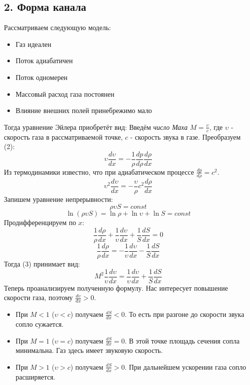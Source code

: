 	\subsection*{2. Форма канала}
	Рассматриваем следующую модель:
	\begin{itemize}
	\item Газ идеален
	\item Поток адиабатичен
	\item Поток одномерен
	\item Массовый расход газа постоянен
	\item Влияние внешних полей принебрежимо мало
	\end{itemize}
	Тогда уравнение Эйлера приобретёт вид:
	Введём \textit{число Маха} $M = \frac{\upsilon}{c}$, где $\upsilon$ - скорость газа в рассматриваемой точке, $c$ - скорость звука в газе.\n\n
	Преобразуем (2):
	\[\upsilon \frac{d\upsilon}{dx} = - \frac{1}{\rho} \frac{dp}{d\rho}\frac{d\rho}{dx}\]\n
	Из термодинамики известно, что при адиабатическом процессе $\frac{dp}{d\rho} = c^2$.
	\[\upsilon^2 \frac{d\upsilon}{dx} = - \frac{\upsilon}{\rho} c^2 \frac{d\rho}{dx}\]
	\n\n
	Запишем уравнение непрерывности:
	\[\rho \upsilon S = const\]
	\[\ln(\rho \upsilon S) = \ln\rho + \ln\upsilon + \ln S = const\]\n
	Продифференцируем по $x$:
	\[\frac{1}{\rho}\frac{d\rho}{dx} + \frac{1}{\upsilon}\frac{d\upsilon}{dx} + \frac{1}{S}\frac{dS}{dx} = 0\]
	\[\frac{1}{\rho}\frac{d\rho}{dx} = -\frac{1}{\upsilon}\frac{d\upsilon}{dx} - \frac{1}{S}\frac{dS}{dx}\]\n\n
	Тогда (3) принимает вид:
	\[M^2 \frac{1}{\upsilon} \frac{d\upsilon}{dx} = \frac{1}{\upsilon}\frac{d\upsilon}{dx} + \frac{1}{S}\frac{dS}{dx}\]
	\be{\frac{dS}{dx} = \frac{S}{\upsilon} \frac{d\upsilon}{dx} (M^2 - 1)}
	\newpage
	\n
	Теперь проанализируем полученную формулу. Нас интересует повышение скорости газа, поэтому $\frac{d\upsilon}{dx} > 0$.
	\begin{itemize}
	\item При $M < 1$ ($\upsilon < c$) получаем $\frac{dS}{dx} < 0$. То есть при разгоне до скорости звука сопло сужается.
	\item При $M = 1$ ($\upsilon = c$) получаем $\frac{dS}{dx} = 0$. В этой точке площадь сечения сопла минимальна. Газ здесь имеет звуковую скорость.
	\item При $M > 1$ ($\upsilon > c$) получаем $\frac{dS}{dx} > 0$.
При дальнейшем ускорении газа сопло расширяется.
	\end{itemize}
